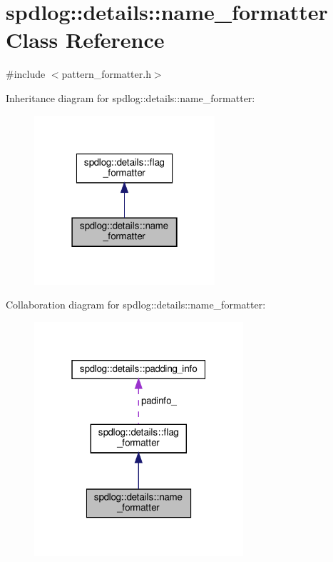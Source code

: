 \hypertarget{classspdlog_1_1details_1_1name__formatter}{}\section{spdlog\+:\+:details\+:\+:name\+\_\+formatter Class Reference}
\label{classspdlog_1_1details_1_1name__formatter}


{\ttfamily \#include $<$pattern\+\_\+formatter.\+h$>$}



Inheritance diagram for spdlog\+:\+:details\+:\+:name\+\_\+formatter\+:
\nopagebreak
\begin{figure}[H]
\begin{center}
\leavevmode
\includegraphics[width=190pt]{classspdlog_1_1details_1_1name__formatter__inherit__graph}
\end{center}
\end{figure}


Collaboration diagram for spdlog\+:\+:details\+:\+:name\+\_\+formatter\+:
\nopagebreak
\begin{figure}[H]
\begin{center}
\leavevmode
\includegraphics[width=220pt]{classspdlog_1_1details_1_1name__formatter__coll__graph}
\end{center}
\end{figure}
